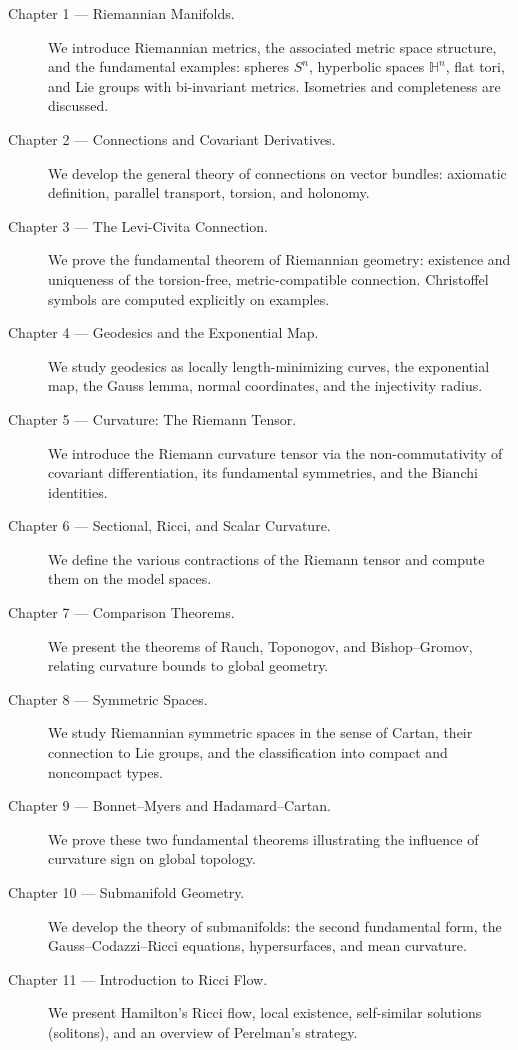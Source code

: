 \begin{description}
    \item[Chapter 1 --- Riemannian Manifolds.]
    We introduce Riemannian metrics, the associated metric space structure, and
    the fundamental examples: spheres $S^n$, hyperbolic spaces $\mathbb{H}^n$,
    flat tori, and Lie groups with bi-invariant metrics. Isometries and completeness
    are discussed.

    \item[Chapter 2 --- Connections and Covariant Derivatives.]
    We develop the general theory of connections on vector bundles: axiomatic
    definition, parallel transport, torsion, and holonomy.

    \item[Chapter 3 --- The Levi-Civita Connection.]
    We prove the fundamental theorem of Riemannian geometry: existence and
    uniqueness of the torsion-free, metric-compatible connection. Christoffel
    symbols are computed explicitly on examples.

    \item[Chapter 4 --- Geodesics and the Exponential Map.]
    We study geodesics as locally length-minimizing curves, the exponential map,
    the Gauss lemma, normal coordinates, and the injectivity radius.

    \item[Chapter 5 --- Curvature: The Riemann Tensor.]
    We introduce the Riemann curvature tensor via the non-commutativity of
    covariant differentiation, its fundamental symmetries, and the Bianchi
    identities.

    \item[Chapter 6 --- Sectional, Ricci, and Scalar Curvature.]
    We define the various contractions of the Riemann tensor and compute them
    on the model spaces.

    \item[Chapter 7 --- Comparison Theorems.]
    We present the theorems of Rauch, Toponogov, and Bishop--Gromov, relating
    curvature bounds to global geometry.

    \item[Chapter 8 --- Symmetric Spaces.]
    We study Riemannian symmetric spaces in the sense of Cartan, their connection
    to Lie groups, and the classification into compact and noncompact types.

    \item[Chapter 9 --- Bonnet--Myers and Hadamard--Cartan.]
    We prove these two fundamental theorems illustrating the influence of
    curvature sign on global topology.

    \item[Chapter 10 --- Submanifold Geometry.]
    We develop the theory of submanifolds: the second fundamental form,
    the Gauss--Codazzi--Ricci equations, hypersurfaces, and mean curvature.

    \item[Chapter 11 --- Introduction to Ricci Flow.]
    We present Hamilton's Ricci flow, local existence, self-similar solutions
    (solitons), and an overview of Perelman's strategy.
\end{description}


